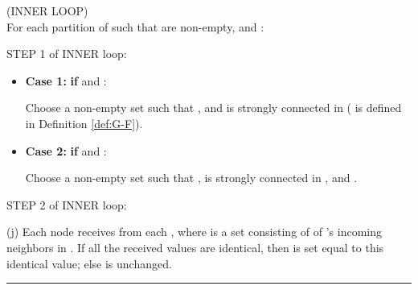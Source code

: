 \documentclass[letterpaper, 11pt]{article}
\newcommand{\Propagate}{{\tt Propagate}}
\newcommand{\Equality}{{\tt Equality}}
\begin{document}
  \begin{list}{}{}
  \item (INNER LOOP)\\For each partition  of  such
	 that  are non-empty, and :

	STEP 1 of INNER loop:

	\begin{itemize}
	\item {\bf Case 1:}
            {\bf if}  and :

	Choose a non-empty set  such that ,	and  is strongly connected in  ( is defined in Definition \ref{def:G-F}).


	\item {\bf Case 2:}
            {\bf if}  and :

	Choose a non-empty set  such that	,	 is strongly connected in , and .


	\end{itemize}  

	STEP 2 of INNER loop:
        \begin{list}{}{}
	\item[(j)] Each node  receives  from
		each , where  is a set consisting of
		 of 's incoming neighbors in .
		If all the received values are identical, then  is
		set equal to this identical value; else  is unchanged.
	\end{list}
   \end{list}

\hrule
\end{document}
